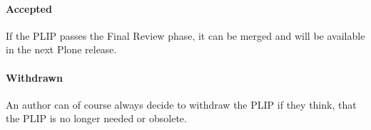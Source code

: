 \paragraph{Accepted}

If the \ac{PLIP} passes the Final Review phase, it can be merged and will be
available in the next Plone release.

\paragraph{Withdrawn}

An author can of course always decide to withdraw the \ac{PLIP} if they think,
that the \ac{PLIP} is no longer needed or obsolete.


